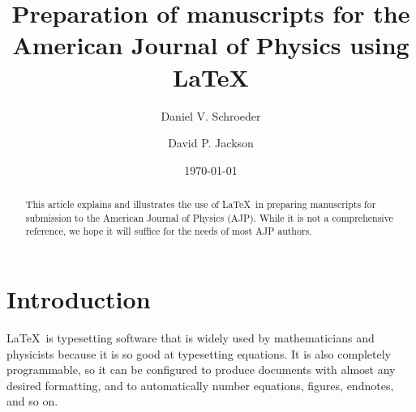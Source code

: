 \documentclass[prb,preprint]{revtex4-1}
\begin{document}

\title{Preparation of manuscripts for the American Journal of Physics
using \LaTeX}

\author{Daniel V. Schroeder}

\author{David P. Jackson}


\date{\today}

\begin{abstract}
This article explains and illustrates the use of \LaTeX\ in preparing manuscripts
for submission to the American Journal of Physics (AJP). While it is not a
comprehensive reference, we hope it will suffice for the needs of most
AJP authors.
\end{abstract}

\maketitle %


\section{Introduction} %

\LaTeX\ is typesetting software that is widely used by mathematicians
and physicists because it is so good at typesetting equations. It is 
also completely programmable, so it can be configured to produce 
documents with almost any desired formatting, and to automatically
number equations, figures, endnotes, and so on.
\end{document}
